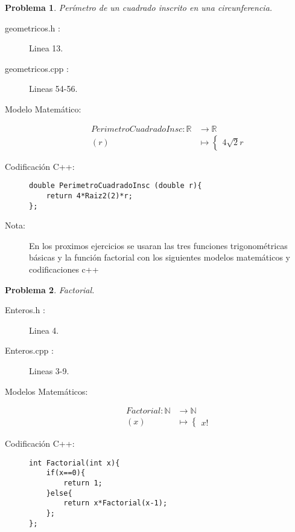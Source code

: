 \documentclass{article}
\theoremstyle{plain}
\theoremstyle{definition}
\newtheorem{problem}{Problema}
\begin{document}
\begin{problem} \emph{Perímetro de un cuadrado inscrito en una circunferencia.}\\
\begin{description}
\item[geometricos.h :] Linea 13. \item[geometricos.cpp :] Lineas 54-56.

\item[Modelo Matemático:]
\begin{align*}
PerimetroCuadradoInsc: \mathbb{R} &\to \mathbb{R}\\
(r) &\mapsto \begin{cases}
4\sqrt{2}r
\end{cases}
\end{align*}
%
\item[Codificación \textsf{C++}:]\hfill
%
\begin{verbatim}
double PerimetroCuadradoInsc (double r){
    return 4*Raiz2(2)*r;
};
\end{verbatim}
\item[Nota:]
En los proximos ejercicios se usaran las tres funciones trigonométricas básicas y la función factorial con los siguientes modelos matemáticos y codificaciones c++\\
\end{description}
\end{problem}

\begin{problem} \emph{Factorial.}\\
\begin{description}
\item[Enteros.h :] Linea 4. \item[Enteros.cpp :] Lineas 3-9.
\item[Modelos Matemáticos:]
\begin{align*}
Factorial: \mathbb{N} &\to \mathbb{N}\\
(x) &\mapsto \begin{cases}
x!
\end{cases}
\end{align*}
\item[Codificación \textsf{C++}:]\hfill
\begin{verbatim}
int Factorial(int x){
    if(x==0){
        return 1;
    }else{
        return x*Factorial(x-1);
    };
};
\end{verbatim}
\end{description}
\end{problem}
\end{document}
